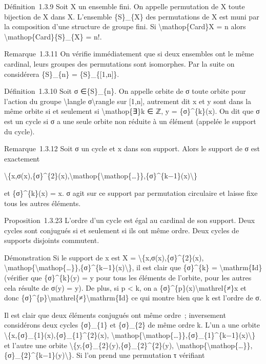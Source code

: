 \documentclass[]{article}
\begin{document}
Définition~1.3.9 Soit X un ensemble fini. On appelle permutation de X
toute bijection de X dans X. L'ensemble \{S\}\_\{X\} des permutations de
X est muni par la composition d'une structure de groupe fini. Si
\textbackslash{}mathop\{Card\}X = n alors
\textbackslash{}mathop\{Card\}\{S\}\_\{X\} = n!.

Remarque~1.3.11 On vérifie immédiatement que si deux ensembles ont le
même cardinal, leurs groupes des permutations sont isomorphes. Par la
suite on considérera \{S\}\_\{n\} = \{S\}\_\{{[}1,n{]}\}.

Définition~1.3.10 Soit σ ∈\{S\}\_\{n\}. On appelle orbite de σ toute
orbite pour l'action du groupe \textbackslash{}langle
σ\textbackslash{}rangle sur {[}1,n{]}, autrement dit x et y sont dans la
même orbite si et seulement si \textbackslash{}mathop\{∃\}k ∈ ℤ, y =
\{σ\}\^{}\{k\}(x). On dit que σ est un cycle si σ a une seule orbite non
réduite à un élément (appelée le support du cycle).

Remarque~1.3.12 Soit σ un cycle et x dans son support. Alors le support
de σ est exactement

\textbackslash{}\{x,σ(x),\{σ\}\^{}\{2\}(x),\textbackslash{}mathop\{\textbackslash{}mathop\{\ldots{}\}\},\{σ\}\^{}\{k−1\}(x)\textbackslash{}\}

et \{σ\}\^{}\{k\}(x) = x. σ agit sur ce support par permutation
circulaire et laisse fixe tous les autres éléments.

Proposition~1.3.23 L'ordre d'un cycle est égal au cardinal de son
support. Deux cycles sont conjugués si et seulement si ils ont même
ordre. Deux cycles de supports disjoints commutent.

Démonstration Si le support de x est X =
\textbackslash{}\{x,σ(x),\{σ\}\^{}\{2\}(x),
\textbackslash{}mathop\{\textbackslash{}mathop\{\ldots{}\}\},\{σ\}\^{}\{k−1\}(x)\textbackslash{}\},
il est clair que \{σ\}\^{}\{k\} = \textbackslash{}mathrm\{Id\} (vérifier
que \{σ\}\^{}\{k\}(y) = y pour tous les éléments de l'orbite, pour les
autres cela résulte de σ(y) = y). De plus, si p \textless{} k, on a
\{σ\}\^{}\{p\}(x)\textbackslash{}mathrel\{≠\}x et donc
\{σ\}\^{}\{p\}\textbackslash{}mathrel\{≠\}\textbackslash{}mathrm\{Id\}
ce qui montre bien que k est l'ordre de σ.

Il est clair que deux éléments conjugués ont même ordre~; inversement
considérons deux cycles \{σ\}\_\{1\} et \{σ\}\_\{2\} de même ordre k.
L'un a une orbite
\textbackslash{}\{x,\{σ\}\_\{1\}(x),\{σ\}\_\{1\}\^{}\{2\}(x),
\textbackslash{}mathop\{\textbackslash{}mathop\{\ldots{}\}\},\{σ\}\_\{1\}\^{}\{k−1\}(x)\textbackslash{}\}
et l'autre une orbite
\textbackslash{}\{y,\{σ\}\_\{2\}(y),\{σ\}\_\{2\}\^{}\{2\}(y),
\textbackslash{}mathop\{\textbackslash{}mathop\{\ldots{}\}\},\{σ\}\_\{2\}\^{}\{k−1\}(y)\textbackslash{}\}.
Si l'on prend une permutation τ vérifiant
\end{document}
